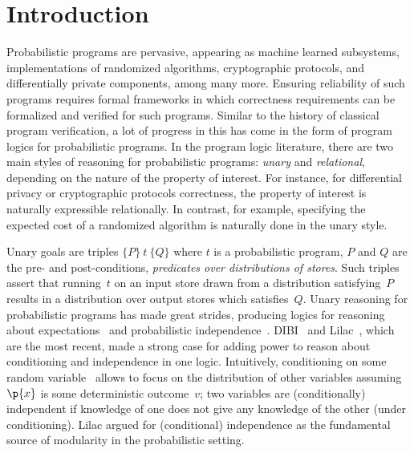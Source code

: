 \section{Introduction}\label{sec:intro}
Probabilistic programs are pervasive, appearing as
  machine learned subsystems,
  implementations of randomized algorithms,
  cryptographic protocols, and
  differentially private components,
among many more.
Ensuring reliability of such programs requires formal frameworks
in which correctness requirements can be formalized and verified
for such programs.
Similar to the history of classical program verification,
a lot of progress in this has come in the form of program logics
for probabilistic programs.
In the program logic literature,
there are two main styles of reasoning for probabilistic programs:
\emph{unary} and \emph{relational},
depending on the nature of the property of interest.
For instance, for differential privacy or cryptographic protocols correctness,
the property of interest is naturally expressible relationally.
In contrast, for example, specifying the expected cost of a
randomized algorithm is naturally done in the unary style.

Unary goals are triples $ \{P\}\ t\ \{Q\}$ where
$t$ is a probabilistic program,
$P$ and $Q$ are the pre- and post-conditions,
\ie \emph{predicates over distributions of stores}.
Such triples assert that
running~$t$ on an input store drawn from a distribution satisfying~$P$
results in a distribution over output stores which satisfies~$Q$.
Unary reasoning for probabilistic programs has made great strides,
producing logics for reasoning about
  expectations~\cite{kozen1983PDL,Morgan:1996,kaminski2016weakest,kaminski2019thesis,aguirre2021pre,Bartocci2022moment}
  and probabilistic independence~\cite{barthe2019probabilistic}.
  DIBI~\cite{bao2021bunched} and Lilac~\cite{lilac},
  which are the most recent, made a strong case for adding power to reason
about conditioning and independence in one logic.
Intuitively, conditioning on some random variable~
allows to focus on the distribution of other variables
assuming~$\p{x}$ is some deterministic outcome~$v$;
two variables are (conditionally) independent if
knowledge of one does not give any knowledge of the other (under conditioning).
Lilac argued for (conditional) independence as the fundamental source of
modularity in the probabilistic setting.

